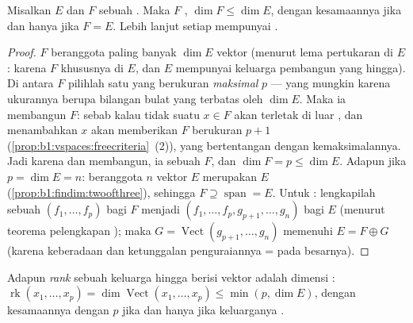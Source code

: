 \begin{theorem}[Subruang]\label{thm:b1:findim:subspaces}
Misalkan $E$  dan $F$ sebuah . Maka $F$
, $\dim F \leq \dim E$, dengan kesamaannya jika dan hanya
jika $F = E$. Lebih lanjut setiap  mempunyai  .
\end{theorem}

\begin{proof}
 $F$ beranggota paling banyak $\dim E$ vektor (menurut lema pertukaran
di $E$: karena  $F$ khususnya  di $E$, dan $E$
mempunyai keluarga pembangun yang hingga). Di antara  $F$
pilihlah satu yang berukuran \emph{maksimal} $p$ --- yang mungkin karena ukurannya
berupa bilangan bulat yang terbatas oleh $\dim E$. Maka ia membangun $F$: sebab kalau tidak suatu
$x \in F$ akan terletak di luar , dan menambahkan $x$ akan memberikan
 $F$ berukuran $p + 1$
(\cref{prop:b1:vspaces:freecriteria}~(2)), yang bertentangan dengan
kemaksimalannya. Jadi karena  dan membangun, ia sebuah  $F$, dan
$\dim F = p \leq \dim E$. Adapun jika $p = \dim E = n$:  beranggota $n$ vektor
$E$ merupakan  $E$ (\cref{prop:b1:findim:twoofthree}), sehingga $F
\supseteq \operatorname{span} = E$. Untuk : lengkapilah sebuah 
$(f_1, \dots, f_p)$ bagi $F$ menjadi  $(f_1, \dots, f_p, g_{p+1},
\dots, g_n)$ bagi $E$ (menurut teorema pelengkapan ); maka $G =
\operatorname{Vect}(g_{p+1}, \dots, g_n)$ memenuhi $E = F \oplus G$
(karena keberadaan dan ketunggalan penguraiannya =  pada
 besarnya).
\end{proof}

\begin{definition}\label{def:b1:findim:rank}
Adapun \emph{rank} sebuah keluarga hingga berisi
vektor adalah dimensi :
$\operatorname{rk}(x_1, \dots, x_p) = \dim
\operatorname{Vect}(x_1, \dots, x_p) \leq \min(p, \dim E)$,
dengan kesamaannya dengan $p$ jika dan hanya jika keluarganya .
\end{definition}

